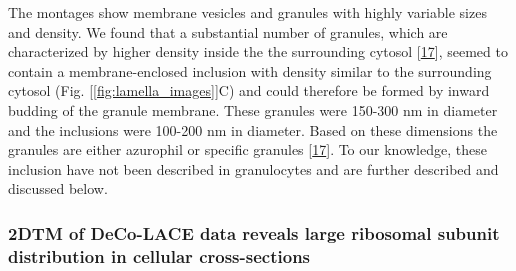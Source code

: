 \documentclass[
]{article}
\begin{document}
The montages show membrane vesicles and granules with highly variable
sizes and density. We found that a substantial number of granules, which
are characterized by higher density inside the the surrounding cytosol
{[}\protect\hyperlink{ref-xE2EhAcH}{17}{]}, seemed to contain a membrane-enclosed
inclusion with density similar to the surrounding cytosol (Fig.
{[}\ref{fig:lamella_images}{]}C) and could therefore be formed by inward budding
of the granule membrane. These granules were 150-300 nm in diameter and
the inclusions were 100-200 nm in diameter. Based on these dimensions
the granules are either azurophil or specific granules
{[}\protect\hyperlink{ref-xE2EhAcH}{17}{]}. To our knowledge, these inclusion have not
been described in granulocytes and are further described and discussed
below.

\hypertarget{dtm-of-deco-lace-data-reveals-large-ribosomal-subunit-distribution-in-cellular-cross-sections}{%
\subsubsection{2DTM of DeCo-LACE data reveals large ribosomal subunit distribution in cellular cross-sections}\label{dtm-of-deco-lace-data-reveals-large-ribosomal-subunit-distribution-in-cellular-cross-sections}}
\end{document}
